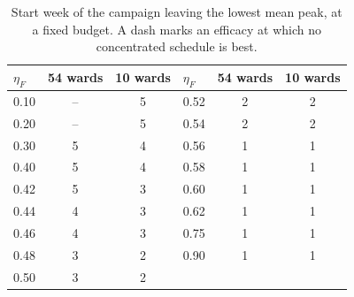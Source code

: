 \begin{table}[htbp]
\centering\small
\caption{Start week of the campaign leaving the lowest mean peak, at a fixed budget. A dash marks an efficacy at which no concentrated schedule is best.}
\label{tab:start-week}
\begin{tabular}{@{}lcc@{\qquad}lcc@{}}
\toprule
$\eta_{F}$ & 54 wards & 10 wards & $\eta_{F}$ & 54 wards & 10 wards \\
\midrule
0.10 & -- & 5 & 0.52 & 2 & 2 \\
0.20 & -- & 5 & 0.54 & 2 & 2 \\
0.30 & 5 & 4 & 0.56 & 1 & 1 \\
0.40 & 5 & 4 & 0.58 & 1 & 1 \\
0.42 & 5 & 3 & 0.60 & 1 & 1 \\
0.44 & 4 & 3 & 0.62 & 1 & 1 \\
0.46 & 4 & 3 & 0.75 & 1 & 1 \\
0.48 & 3 & 2 & 0.90 & 1 & 1 \\
0.50 & 3 & 2 &  &  &  \\
\bottomrule
\end{tabular}
\end{table}
